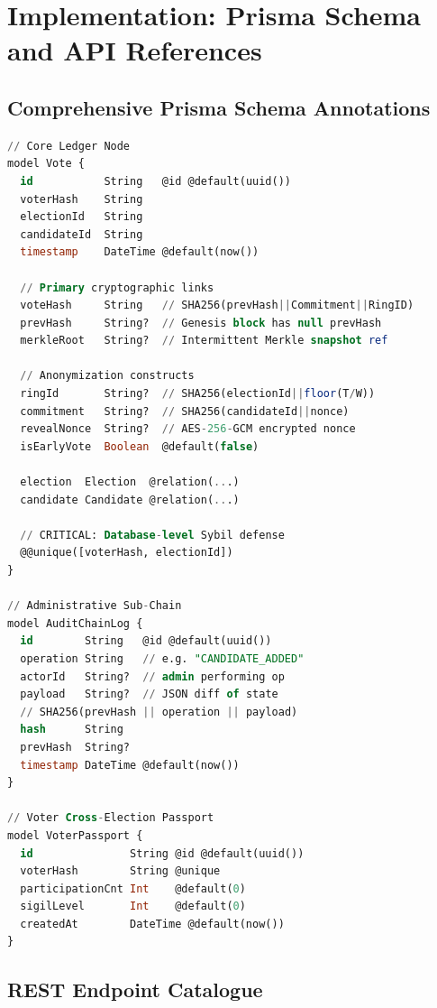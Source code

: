 \documentclass[journal,10pt,twocolumn]{IEEEtran}
\begin{document}
\section{Implementation: Prisma Schema and API References}

\subsection{Comprehensive Prisma Schema Annotations}

\begin{lstlisting}[language=SQL, caption={Core Ledger Vote Model with Full Cryptographic Annotations}]
// Core Ledger Node
model Vote {
  id           String   @id @default(uuid())
  voterHash    String
  electionId   String
  candidateId  String
  timestamp    DateTime @default(now())
  
  // Primary cryptographic links
  voteHash     String   // SHA256(prevHash||Commitment||RingID)
  prevHash     String?  // Genesis block has null prevHash
  merkleRoot   String?  // Intermittent Merkle snapshot ref
  
  // Anonymization constructs
  ringId       String?  // SHA256(electionId||floor(T/W))
  commitment   String?  // SHA256(candidateId||nonce)
  revealNonce  String?  // AES-256-GCM encrypted nonce
  isEarlyVote  Boolean  @default(false)
  
  election  Election  @relation(...)
  candidate Candidate @relation(...)

  // CRITICAL: Database-level Sybil defense
  @@unique([voterHash, electionId])
}

// Administrative Sub-Chain
model AuditChainLog {
  id        String   @id @default(uuid())
  operation String   // e.g. "CANDIDATE_ADDED"
  actorId   String?  // admin performing op
  payload   String?  // JSON diff of state
  // SHA256(prevHash || operation || payload)
  hash      String
  prevHash  String?
  timestamp DateTime @default(now())
}

// Voter Cross-Election Passport
model VoterPassport {
  id               String @id @default(uuid())
  voterHash        String @unique
  participationCnt Int    @default(0)
  sigilLevel       Int    @default(0)
  createdAt        DateTime @default(now())
}
\end{lstlisting}

\subsection{REST Endpoint Catalogue}
\end{document}
